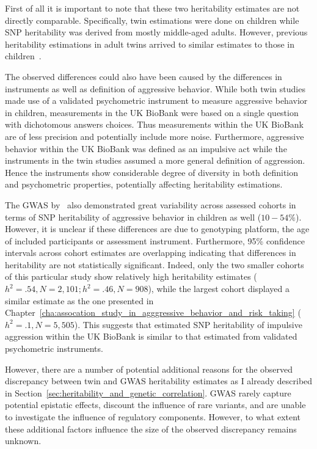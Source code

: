 First of all it is important to note that these two heritability estimates are not directly comparable.
Specifically, twin estimations were done on children while SNP heritability was derived from mostly middle-aged adults.
However, previous heritability estimations in adult twins arrived to similar estimates to those in children~\cite{Miles1997a}.

The observed differences could also have been caused by the differences in  instruments as well as definition of aggressive behavior.
While both  twin studies made use of a validated psychometric instrument to measure aggressive behavior in children, measurements in the UK BioBank were based on a single question with dichotomous answers choices.
Thus measurements within the UK BioBank are of less precision and potentially include more noise.
Furthermore, aggressive behavior within the UK BioBank was defined as an impulsive act while the  instruments in the twin studies assumed a more general definition of aggression.
Hence the  instruments show considerable degree of diversity in both definition and psychometric properties, potentially affecting heritability estimations.

The GWAS by~\citet{Pappa2016a} also demonstrated great variability across assessed cohorts in terms of SNP heritability of aggressive behavior in children as well ($10-54\%$).
However, it is unclear if these differences are due to genotyping platform, the age of included participants or  assessment instrument.
Furthermore, 95\% confidence intervals across cohort estimates are overlapping indicating that differences in heritability are not statistically significant.
Indeed, only the two smaller cohorts of this particular study show relatively high heritability estimates ($h^2=.54, N=2,101; h^2=.46, N=908$), while the largest cohort displayed a similar estimate as the one presented in Chapter~\ref{cha:assocation_study_in_agggressive_behavior_and_risk_taking} ($h^2=.1, N=5,505$).
This suggests that estimated SNP heritability of impulsive aggression within the UK BioBank is similar to that estimated from validated psychometric instruments. 

However, there are a number of potential additional reasons for the observed discrepancy between twin and GWAS heritability estimates as I already described in Section~\ref{sec:heritability_and_genetic_correlation}.
GWAS rarely capture potential epistatic effects, discount the influence of rare variants, and are unable to investigate the influence of regulatory components. 
However, to what extent these additional factors influence the size of the observed discrepancy remains unknown.


